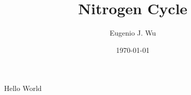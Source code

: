 \documentclass[12 pt]{article}
\title{Nitrogen Cycle}
\author{Eugenio J. Wu}
\date{\today}
\begin{document}
    \maketitle
    Hello World
\end{document}
